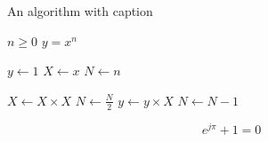 \begin{algorithm}[ht]
    \caption{An algorithm with caption}\label{alg:two}
    \begin{algorithmic}
        \REQUIRE $n \geq 0$
        \ENSURE $y = x^n$
        
        \STATE $y \gets 1$
        \STATE $X \gets x$
        \STATE $N \gets n$
        
              \STATE $X \gets X \times X$
              \STATE $N \gets \frac{N}{2} $  
              \STATE $y \gets y \times X$
              \STATE $N \gets N - 1$
            \ENDIF
        \ENDWHILE
    \end{algorithmic}
\end{algorithm}

\begin{equation}
e^{j\pi} + 1 = 0
\end{equation}